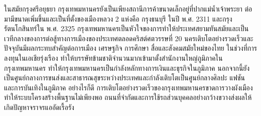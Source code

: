 \documentclass{article}
\begin{document}
ในสมัยกรุงศรีอยุธยา กรุงเทพมหานครยังเป็นเพียงสถานีการค้าขนาดเล็กอยู่ที่ปากแม่น้ำเจ้าพระยา ต่อมามีขนาดเพิ่มขึ้นและเป็นที่ตั้งของเมืองหลวง 2 แห่งคือ กรุงธนบุรี ในปี พ.ศ. 2311 และกรุงรัตนโกสินทร์ใน พ.ศ. 2325 กรุงเทพมหานครเป็นหัวใจของการทำให้ประเทศสยามทันสมัยและเป็นเวทีกลางของการต่อสู้ทางการเมืองของประเทศตลอดคริสต์ศตวรรษที่ 20 นครเติบโตอย่างรวดเร็วและปัจจุบันมีผลกระทบสำคัญต่อการเมือง เศรษฐกิจ การศึกษา สื่อและสังคมสมัยใหม่ของไทย ในช่วงที่การลงทุนในเอเชียรุ่งเรือง ทำให้บรรษัทข้ามชาติจำนวนมากเข้ามาตั้งสำนักงานใหญ่ภูมิภาคในกรุงเทพมหานคร ทำให้กรุงเทพมหานครเป็นกำลังหลักทางการเงินและธุรกิจในภูมิภาค นอกจากนี้ยังเป็นศูนย์กลางการขนส่งและสาธารณสุขระหว่างประเทศและกำลังเติบโตเป็นศูนย์กลางศิลปะ แฟชัน และการบันเทิงในภูมิภาค อย่างไรก็ดี การเติบโตอย่างรวดเร็วของกรุงเทพมหานครขาดการวางผังเมือง ทำให้ระบบโครงสร้างพื้นฐานไม่เพียงพอ ถนนที่จำกัดและการใช้รถส่วนบุคคลอย่างกว้างขวางส่งผลให้เกิดปัญหาจราจรแออัดเรื้อรัง
\end{document}

